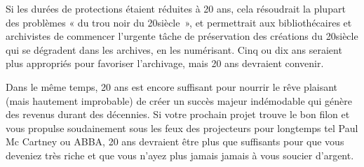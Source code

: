 Si les durées de protections étaient réduites à 20 ans, cela résoudrait la plupart des problèmes «
du trou noir du 20\ieme siècle~», et permettrait aux bibliothécaires et archivistes de commencer
l’urgente tâche de préservation des créations du 20\ieme siècle qui se dégradent dans les archives, en
les numérisant. Cinq ou dix ans seraient plus appropriés pour favoriser l’archivage, mais 20 ans
devraient convenir.

Dans le même temps, 20 ans est encore suffisant pour nourrir le rêve plaisant (mais hautement
improbable) de créer un succès majeur indémodable qui génère des revenus durant des décennies. Si
votre prochain projet trouve le bon filon et vous propulse soudainement sous les feux des
projecteurs pour longtemps tel Paul Mc Cartney ou ABBA, 20 ans devraient
être plus que suffisants pour que vous deveniez très riche et que vous n’ayez plus jamais jamais à
vous soucier d’argent.
